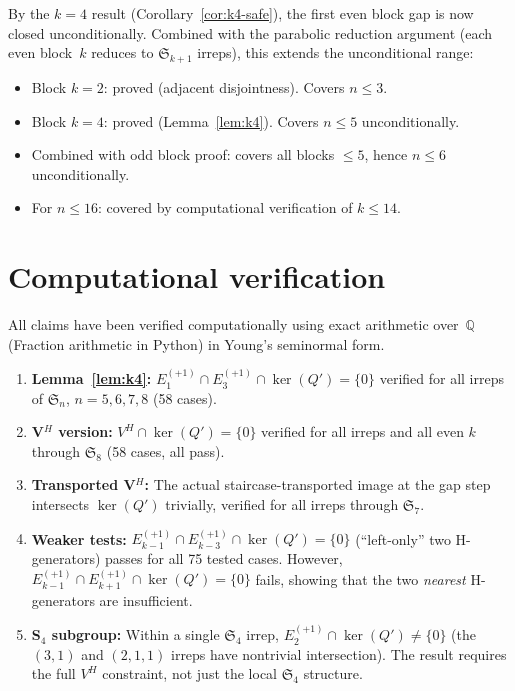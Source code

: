 \documentclass[11pt]{article}
\theoremstyle{definition}
\theoremstyle{remark}
\newcommand{\Sym}{\mathfrak{S}}
\begin{document}
\medskip

By the $k = 4$ result (Corollary~\ref{cor:k4-safe}), the first even
block gap is now closed unconditionally. Combined with the
parabolic reduction argument (each even block~$k$ reduces to
$\Sym_{k+1}$ irreps), this extends the unconditional range:
\begin{itemize}
\item Block $k = 2$: proved (adjacent disjointness).
  Covers $n \le 3$.
\item Block $k = 4$: proved (Lemma~\ref{lem:k4}).
  Covers $n \le 5$ unconditionally.
\item Combined with odd block proof: covers all blocks $\le 5$,
  hence $n \le 6$ unconditionally.
\item For $n \le 16$: covered by computational verification of
  $k \le 14$.
\end{itemize}


\section{Computational verification}

All claims have been verified computationally using exact arithmetic
over~$\mathbb{Q}$ (Fraction arithmetic in Python) in Young's
seminormal form.

\begin{enumerate}
\item \textbf{Lemma~\ref{lem:k4}:} $E_1^{(+1)} \cap E_3^{(+1)}
  \cap \ker(Q') = \{0\}$ verified for all irreps of $\Sym_n$,
  $n = 5, 6, 7, 8$ (58 cases).

\item \textbf{V$^H$ version:} $V^H \cap \ker(Q') = \{0\}$ verified
  for all irreps and all even $k$ through $\Sym_8$ (58 cases,
  all pass).

\item \textbf{Transported V$^H$:} The actual staircase-transported
  image at the gap step intersects $\ker(Q')$ trivially, verified
  for all irreps through $\Sym_7$.

\item \textbf{Weaker tests:}
  $E_{k-1}^{(+1)} \cap E_{k-3}^{(+1)} \cap \ker(Q') = \{0\}$
  (``left-only'' two H-generators) passes for all 75 tested cases.
  However, $E_{k-1}^{(+1)} \cap E_{k+1}^{(+1)} \cap \ker(Q') = \{0\}$
  fails, showing that the two \emph{nearest} H-generators are
  insufficient.

\item \textbf{S$_4$ subgroup:} Within a single $\Sym_4$ irrep,
  $E_2^{(+1)} \cap \ker(Q') \ne \{0\}$ (the $(3,1)$ and $(2,1,1)$
  irreps have nontrivial intersection). The result requires the
  full $V^H$ constraint, not just the local $\Sym_4$ structure.
\end{enumerate}
\end{document}
